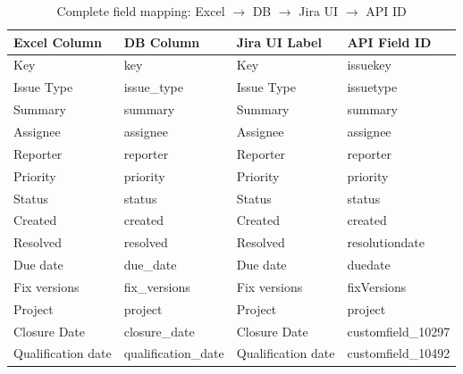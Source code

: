 \documentclass[12pt, a4paper]{article}
\begin{document}
\begin{longtable}{>{\small}p{3.6cm} >{\ttfamily\small}p{3.2cm} >{\small}p{3.0cm} >{\ttfamily\small}p{3.0cm}}
    \toprule
    \normalfont\textbf{Excel Column} &
    \normalfont\textbf{DB Column} &
    \normalfont\textbf{Jira UI Label} &
    \normalfont\textbf{API Field ID} \\
    \midrule
    \endhead
    \bottomrule
    \endfoot
    \caption{Complete field mapping: Excel $\to$ DB $\to$ Jira UI $\to$ API ID}
    \label{tab:fieldmap}
    \endlastfoot

    Key                        & key                        & Key                          & issuekey \\
    Issue Type                 & issue\_type                & Issue Type                   & issuetype \\
    Summary                    & summary                    & Summary                      & summary \\
    Assignee                   & assignee                   & Assignee                     & assignee \\
    Reporter                   & reporter                   & Reporter                     & reporter \\
    Priority                   & priority                   & Priority                     & priority \\
    Status                     & status                     & Status                       & status \\
    Created                    & created                    & Created                      & created \\
    Resolved                   & resolved                   & Resolved                     & resolutiondate \\
    Due date                   & due\_date                  & Due date                     & duedate \\
    Fix versions               & fix\_versions              & Fix versions                 & fixVersions \\
    Project                    & project                    & Project                      & project \\
    Closure Date               & closure\_date              & Closure Date                 & customfield\_10297 \\
    Qualification date         & qualification\_date        & Qualification date           & customfield\_10492 \\

\end{longtable}
\end{document}
